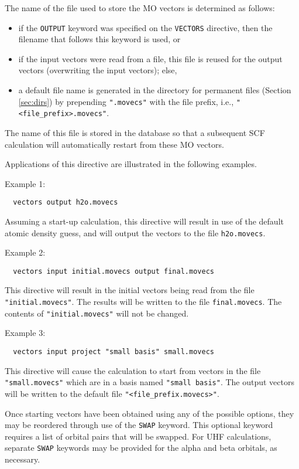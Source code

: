 The name of the file used to store the MO vectors is determined as
follows:
\begin{itemize}
\item if the \verb+OUTPUT+ keyword was specified on the \verb+VECTORS+
  directive, then the filename that follows this keyword is used, or
\item if the input vectors were read from a file, this file is reused
  for the output vectors (overwriting the input vectors); else,
\item a default file name is generated in the directory for permanent
  files (Section \ref{sec:dirs}) by prepending \verb+".movecs"+ with
  the file prefix, i.e., \verb+"<file_prefix>.movecs"+.
\end{itemize}
The name of this file is stored in the database so that a subsequent
SCF calculation will automatically restart from these MO vectors.

Applications of this directive are illustrated in the following
examples.

Example 1:
\begin{verbatim}
  vectors output h2o.movecs
\end{verbatim}
Assuming a start-up calculation, this directive will result in use of
the default atomic density guess, and will output the vectors to the
file \verb+h2o.movecs+.

Example 2:
\begin{verbatim}
  vectors input initial.movecs output final.movecs
\end{verbatim}
This directive will result in the initial vectors being read from the
file \verb+"initial.movecs"+.  The results will be written to the file
\verb+final.movecs+.  The contents of \verb+"initial.movecs"+ will not
be changed.

Example 3:
\begin{verbatim}
  vectors input project "small basis" small.movecs
\end{verbatim}
This directive will cause the calculation to start from vectors in the
file \verb+"small.movecs"+ which are in a basis named \verb+"small basis"+.
The output vectors will be written to the default file
\verb+"<file_prefix.movecs>"+.
 
Once starting vectors have been obtained using any of the possible
options, they may be reordered through use of the \verb+SWAP+ keyword.
This optional keyword requires a list of orbital pairs that will be
swapped.  For UHF calculations, separate \verb+SWAP+ keywords may be
provided for the alpha and beta orbitals, as necessary.

